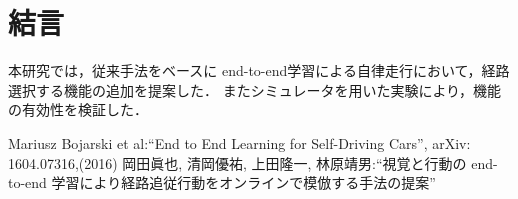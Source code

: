 \documentclass[10pt]{jarticle}
\begin{document}
    \section{結\hspace{2zw}言}%
    本研究では，従来手法をベースに
    end-to-end学習による自律走行において，経路選択する機能の追加を提案した．
    またシミュレータを用いた実験により，機能の有効性を検証した．
    
    {\footnotesize
        \begin{thebibliography}{99}
            
            
            Mariusz Bojarski et al:``End to End Learning for Self-Driving Cars'',
            arXiv: 1604.07316,(2016)
            岡田眞也, 清岡優祐, 上田隆一, 林原靖男:``視覚と行動の end-to-end 
            学習により経路追従行動をオンラインで模倣する手法の提案''
            
            
        \end{thebibliography}
    }
   
        
   
    \vspace{5truemm}
    
    \normalsize
    
\end{document}
